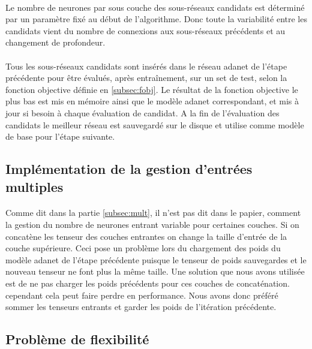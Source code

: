 \documentclass[11 pt]{article}
\begin{document}
\paragraph{}Le nombre de neurones par sous couche des sous-réseaux candidats est déterminé par un paramètre fix\'e au début de l'algorithme. Donc toute la variabilité entre les candidats vient du nombre de connexions aux sous-réseaux précédents et au changement de profondeur.

\paragraph{}Tous les sous-réseaux candidats sont insérés dans le réseau adanet de l’étape précédente pour être évalués, après entraînement, sur un set de test, selon la fonction objective définie en \ref{subsec:fobj}. Le résultat de la fonction objective le plus bas est mis en mémoire ainsi que le modèle adanet correspondant, et mis à jour si besoin à chaque évaluation de candidat. A la fin de l’évaluation des candidats le meilleur réseau est sauvegard\'e sur le disque et utilise comme modèle de base pour l’étape suivante.

\subsection{Implémentation de la gestion d’entrées multiples}
\paragraph{}Comme dit dans la partie \ref{subsec:mult}, il n'est pas dit dans le papier, comment la gestion du nombre de neurones entrant variable pour certaines couches. Si on concatène les tenseur des couches entrantes on change la taille d’entrée de la couche supérieure. Ceci pose un problème lors du chargement des poids du modèle adanet de l’étape précédente 
puisque le tenseur de poids sauvegardes et le nouveau tenseur ne font plus la même taille. Une solution que nous avons utilisée est de ne pas charger les poids précédents pour ces couches de concaténation. cependant cela peut faire perdre en performance. Nous avons donc préféré sommer les tenseurs entrants et garder les poids de l’itération précédente. 

\subsection{Problème de flexibilité}
\end{document}
